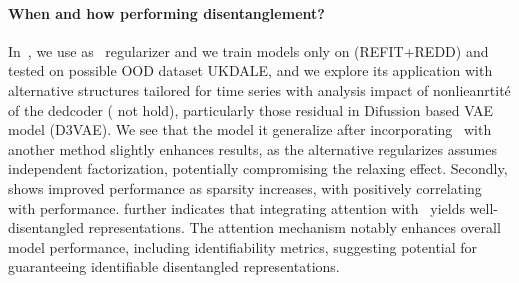 \documentclass{article} %
\theoremstyle{plain}
\theoremstyle{definition}
\theoremstyle{remark}
\numberwithin{equation}{section}
\begin{document}
\paragraph{\bf When and how performing disentanglement?}
In~, we use as  \TimeCSL~regularizer and we train models only on (REFIT+REDD) and tested on possible OOD dataset \ie UKDALE, and we explore its application with alternative structures tailored for time series with analysis impact of nonlieanrtité of the dedcoder ( not hold), particularly those residual in Difussion based VAE model (D3VAE). We see that the model it generalize after incorporating \TimeCSL~with another method slightly enhances results, as the alternative regularizes assumes independent factorization, potentially compromising the relaxing effect. Secondly, \TimeCSL shows improved performance as sparsity increases, with \RSquare positively correlating with performance. \RMIG further indicates that integrating attention with \TimeCSL~yields well-disentangled representations. The attention mechanism notably enhances overall model performance, including identifiability metrics, suggesting potential for guaranteeing identifiable disentangled representations. 

\end{document}
